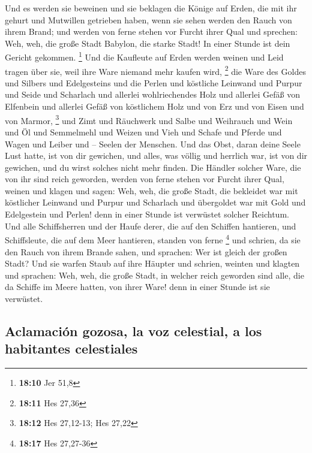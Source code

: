  Und es werden sie beweinen und sie beklagen die Könige
auf Erden, die mit ihr gehurt und Mutwillen getrieben haben, wenn sie
sehen werden den Rauch von ihrem Brand;  und werden von
ferne stehen vor Furcht ihrer Qual und sprechen: Weh, weh, die große
Stadt Babylon, die starke Stadt! In einer Stunde ist dein Gericht
gekommen. \footnote{\textbf{18:10} Jer 51,8}  Und die
Kaufleute auf Erden werden weinen und Leid tragen über sie, weil ihre
Ware niemand mehr kaufen wird, \footnote{\textbf{18:11} Hes 27,36}
 die Ware des Goldes und Silbers und Edelgesteins und die
Perlen und köstliche Leinwand und Purpur und Seide und Scharlach und
allerlei wohlriechendes Holz und allerlei Gefäß von Elfenbein und
allerlei Gefäß von köstlichem Holz und von Erz und von Eisen und von
Marmor, \footnote{\textbf{18:12} Hes 27,12-13; Hes 27,22}
 und Zimt und Räuchwerk und Salbe und Weihrauch und Wein
und Öl und Semmelmehl und Weizen und Vieh und Schafe und Pferde und
Wagen und Leiber und -- Seelen der Menschen.  Und das
Obst, daran deine Seele Lust hatte, ist von dir gewichen, und alles, was
völlig und herrlich war, ist von dir gewichen, und du wirst solches
nicht mehr finden.  Die Händler solcher Ware, die von ihr
sind reich geworden, werden von ferne stehen vor Furcht ihrer Qual,
weinen und klagen  und sagen: Weh, weh, die große Stadt,
die bekleidet war mit köstlicher Leinwand und Purpur und Scharlach und
übergoldet war mit Gold und Edelgestein und Perlen!  denn
in einer Stunde ist verwüstet solcher Reichtum. Und alle Schiffsherren
und der Haufe derer, die auf den Schiffen hantieren, und Schiffsleute,
die auf dem Meer hantieren, standen von ferne \footnote{\textbf{18:17}
  Hes 27,27-36}  und schrien, da sie den Rauch von ihrem
Brande sahen, und sprachen: Wer ist gleich der großen Stadt?
 Und sie warfen Staub auf ihre Häupter und schrien,
weinten und klagten und sprachen: Weh, weh, die große Stadt, in welcher
reich geworden sind alle, die da Schiffe im Meere hatten, von ihrer
Ware! denn in einer Stunde ist sie verwüstet.

\hypertarget{aclamaciuxf3n-gozosa-la-voz-celestial-a-los-habitantes-celestiales}{%
\subsection{Aclamación gozosa, la voz celestial, a los habitantes
celestiales}\label{aclamaciuxf3n-gozosa-la-voz-celestial-a-los-habitantes-celestiales}}

